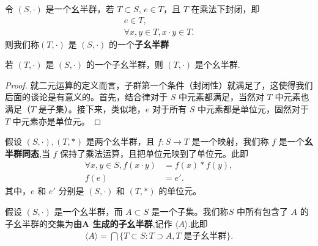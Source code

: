 \documentclass[../../main.tex]{subfiles}
\begin{document}
\begin{definition}[子幺半群]
令 $(S, \cdot)$ 是一个幺半群，若 $T \subset S$, $e \in T$，且 $T$ 在乘法下封闭，即
\begin{gather*}
e \in T ,\\
\forall x, y \in T, x \cdot y\in T .
\end{gather*}
则我们称$(T, \cdot)$ 是 $(S, \cdot)$ 的一个\textbf{子幺半群}
\end{definition}

\begin{proposition}[子幺半群也是幺半群]
若 $(T, \cdot)$ 是 $(S, \cdot)$ 的一个子幺半群，则 $(T, \cdot)$ 是个幺半群.
\end{proposition}
\begin{proof}
就二元运算的定义而言，子群第一个条件（封闭性）就满足了，这使得我们后面的谈论是有意义的。首先，结合律对于 $S$ 中元素都满足，当然对 $T$ 中元素也满足（$T$ 是子集）。接下来，类似地，$e$ 对于所有 $S$ 中元素都是单位元，固然对于 $T$ 中元素亦是单位元。 
\end{proof}

\begin{definition}[幺半群同态]
假设 $(S, \cdot), (T, *)$ 是两个幺半群，且 $f : S \to T$ 是一个映射，我们称 $f$ 是一个\textbf{幺半群同态},当 $f$ 保持了乘法运算，且把单位元映到了单位元。此即
\begin{align*}
\forall x, y \in S, f(x \cdot y) &= f(x) * f(y) ,\\
f(e) &= e'.
\end{align*}
其中，$e$ 和 $e'$ 分别是 $(S, \cdot)$ 和 $(T, *)$ 的单位元。 
\end{definition}

\begin{definition}[由$A$生成的子幺半群]
假设 $(S, \cdot)$ 是一个幺半群，而 $A \subset S$ 是一个子集。我们称$S$ 中所有包含了 $A$ 的子幺半群的交集为\textbf{由$\boldsymbol{A}$ 生成的子幺半群},记作 $\langle A \rangle$.此即
\begin{align*}
\langle A \rangle = \bigcap \{T \subset S : T \supset A, T \text{ 是子幺半群}\}.
\end{align*} 
\end{definition}
\end{document}
